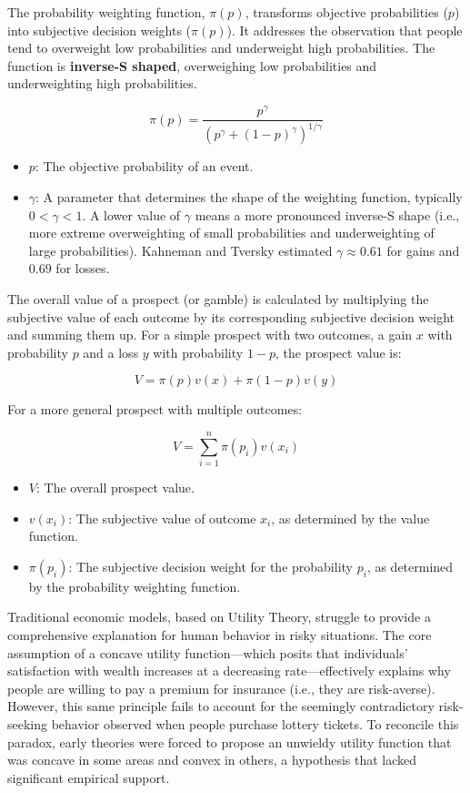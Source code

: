 \documentclass{article}
\begin{document}
The probability weighting function, $\pi(p)$, transforms objective probabilities ($p$) into subjective decision weights ($\pi(p)$). It addresses the observation that people tend to overweight low probabilities and underweight high probabilities. The function is \textbf{inverse-S shaped}, overweighing low probabilities and underweighting high probabilities.

$$
\pi(p) = \frac{p^\gamma}{(p^\gamma + (1-p)^\gamma)^{1/\gamma}}
$$

\begin{itemize}
    \item $p$: The objective probability of an event.
    \item $\gamma$: A parameter that determines the shape of the weighting function, typically $0 < \gamma < 1$. A lower value of $\gamma$ means a more pronounced inverse-S shape (i.e., more extreme overweighting of small probabilities and underweighting of large probabilities). Kahneman and Tversky estimated $\gamma \approx 0.61$ for gains and $0.69$ for losses.
\end{itemize}


The overall value of a prospect (or gamble) is calculated by multiplying the subjective value of each outcome by its corresponding subjective decision weight and summing them up. For a simple prospect with two outcomes, a gain $x$ with probability $p$ and a loss $y$ with probability $1-p$, the prospect value is:

$$
V = \pi(p)v(x) + \pi(1-p)v(y)
$$

For a more general prospect with multiple outcomes:

$$
V = \sum_{i=1}^{n} \pi(p_i)v(x_i)
$$

\begin{itemize}
    \item $V$: The overall prospect value.
    \item $v(x_i)$: The subjective value of outcome $x_i$, as determined by the value function.
    \item $\pi(p_i)$: The subjective decision weight for the probability $p_i$, as determined by the probability weighting function.
\end{itemize}
Traditional economic models, based on Utility Theory, struggle to provide a comprehensive explanation for human behavior in risky situations. The core assumption of a concave utility function—which posits that individuals' satisfaction with wealth increases at a decreasing rate—effectively explains why people are willing to pay a premium for insurance (i.e., they are risk-averse). However, this same principle fails to account for the seemingly contradictory risk-seeking behavior observed when people purchase lottery tickets. To reconcile this paradox, early theories were forced to propose an unwieldy utility function that was concave in some areas and convex in others, a hypothesis that lacked significant empirical support.
\end{document}
